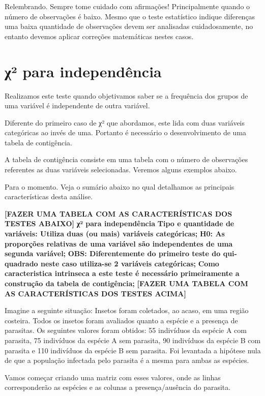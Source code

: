 \documentclass[]{book}
\begin{document}
Relembrando. Sempre tome cuidado com afirmações! Principalmente quando o número de observações é baixo. Mesmo que o teste estatístico indique diferenças uma baixa quantidade de observações devem ser analisadas cuidadosamente, no entanto devemos aplicar correções matemáticas nestes casos.

\hypertarget{ux3c7-para-independuxeancia}{%
\section{χ² para independência}\label{ux3c7-para-independuxeancia}}

Realizamos este teste quando objetivamos saber se a frequência dos grupos de uma variável é independente de outra variável.

Diferente do primeiro caso de χ² que abordamos, este lida com duas variáveis categóricas ao invés de uma. Portanto é necessário o desenvolvimento de uma tabela de contigência.

A tabela de contigência consiste em uma tabela com o número de observações referentes as duas variáveis selecionadas. Veremos alguns exemplos abaixo.

Para o momento. Veja o sumário abaixo no qual detalhamos as principais características desta análise.

\textbf{{[}FAZER UMA TABELA COM AS CARACTERÍSTICAS DOS TESTES ABAIXO{]}}
\textbf{χ² para independência}
\textbf{Tipo e quantidade de variáveis: Utiliza duas (ou mais) variáveis categóricas;}
\textbf{H0: As proporções relativas de uma variável são independentes de uma segunda variável;}
\textbf{OBS: Diferentemente do primeiro teste do qui-quadrado neste caso utiliza-se 2 variáveis categóricas;}
\textbf{Como caracteristica intrinseca a este teste é necessário primeiramente a construção da tabela de contigência;}
\textbf{{[}FAZER UMA TABELA COM AS CARACTERÍSTICAS DOS TESTES ACIMA{]}}

Imagine a seguinte situação: Insetos foram coletados, ao acaso, em uma região costeira. Todos os insetos foram avaliados quanto a espécie e a presença de parasitas. Os seguintes valores foram obtidos: 55 indivíduos da espécie A com parasita, 75 indivíduos da espécie A sem parasita, 90 indivíduos da espécie B com parasita e 110 indivíduos da espécie B sem parasita. Foi levantada a hipótese nula de que a população infectada pelo parasita é a mesma para ambas as espécies.

Vamos começar criando uma matriz com esses valores, onde as linhas corresponderão as espécies e as colunas a presença/ausência do parasita.
\end{document}
